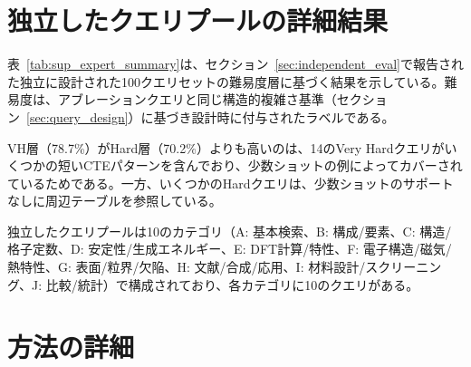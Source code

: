 \documentclass[twocolumn]{interact}
\makeatletter
\def\toprule{\noalign{\ifnum0=`}\fi
  \@aboverulesep=\abovetopsep
  \global\@belowrulesep=\belowrulesep
  \global\@thisruleclass=\@ne
  \@ifnextchar[{\@BTrule}{\@BTrule[\heavyrulewidth]}}
\def\midrule{\noalign{\ifnum0=`}\fi
  \@aboverulesep=\aboverulesep
  \global\@belowrulesep=\belowrulesep
  \global\@thisruleclass=\@ne
  \@ifnextchar[{\@BTrule}{\@BTrule[\lightrulewidth]}}
\def\bottomrule{\noalign{\ifnum0=`}\fi
  \@aboverulesep=\aboverulesep
  \global\@belowrulesep=\belowbottomsep
  \global\@thisruleclass=\@ne
  \@ifnextchar[{\@BTrule}{\@BTrule[\heavyrulewidth]}}
\makeatother
\begin{document}

\section{独立したクエリプールの詳細結果}

\label{sec:sup_expert_queries}

表~\ref{tab:sup_expert_summary}は、セクション~\ref{sec:independent_eval}で報告された独立に設計された100クエリセットの難易度層に基づく結果を示している。難易度は、アブレーションクエリと同じ構造的複雑さ基準（セクション~\ref{sec:query_design}）に基づき設計時に付与されたラベルである。

\begin{table}[htbp]
  \centering
  \caption{難易度別の独立に設計された100クエリの精度。難易度はセクション~\ref{sec:query_design}の構造的複雑さ基準に基づき設計時に付与されたラベルである。}

  \label{tab:sup_expert_summary}
  \footnotesize
\end{table}

VH層（78.7\%）がHard層（70.2\%）よりも高いのは、14のVery Hardクエリがいくつかの短いCTEパターンを含んでおり、少数ショットの例によってカバーされているためである。一方、いくつかのHardクエリは、少数ショットのサポートなしに周辺テーブルを参照している。

独立したクエリプールは10のカテゴリ（A: 基本検索、B: 構成/要素、C: 構造/格子定数、D: 安定性/生成エネルギー、E: DFT計算/特性、F: 電子構造/磁気/熱特性、G: 表面/粒界/欠陥、H: 文献/合成/応用、I: 材料設計/スクリーニング、J: 比較/統計）で構成されており、各カテゴリに10のクエリがある。

\section{方法の詳細}
\label{sec:sup_method_details}
\end{document}
